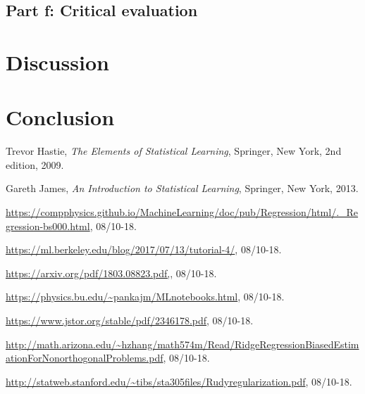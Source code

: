 \documentclass[a4paper,12pt, english]{article}
\begin{document}
\subsection{Part f: Critical evaluation}

\section{Discussion}

\section{Conclusion}

\newpage

\begin{thebibliography}{9}

  Trevor Hastie,
  \textit{The Elements of Statistical Learning},
  Springer, New York,
  2nd edition,
  2009.

  Gareth James, 
  \textit{An Introduction to Statistical Learning},
  Springer, New York,
  2013.
  
  \url{https://compphysics.github.io/MachineLearning/doc/pub/Regression/html/._Regression-bs000.html}, 08/10-18.
  
  \url{https://ml.berkeley.edu/blog/2017/07/13/tutorial-4/}, 08/10-18.
  
  \url{https://arxiv.org/pdf/1803.08823.pdf,}, 08/10-18.
  
  \url{https://physics.bu.edu/~pankajm/MLnotebooks.html}, 08/10-18.
  
  \url{https://www.jstor.org/stable/pdf/2346178.pdf}, 08/10-18.
 
  \url{http://math.arizona.edu/~hzhang/math574m/Read/RidgeRegressionBiasedEstimationForNonorthogonalProblems.pdf}, 08/10-18.
  
  \url{http://statweb.stanford.edu/~tibs/sta305files/Rudyregularization.pdf}, 08/10-18.
  

\end{thebibliography}
\end{document}
